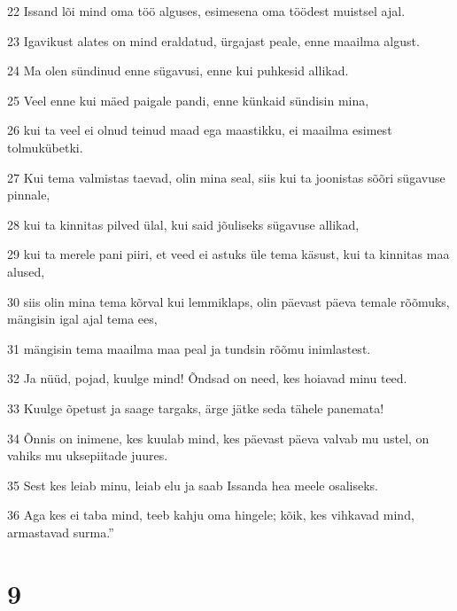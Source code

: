 \par 22 Issand lõi mind oma töö alguses, esimesena oma töödest muistsel ajal.
\par 23 Igavikust alates on mind eraldatud, ürgajast peale, enne maailma algust.
\par 24 Ma olen sündinud enne sügavusi, enne kui puhkesid allikad.
\par 25 Veel enne kui mäed paigale pandi, enne künkaid sündisin mina,
\par 26 kui ta veel ei olnud teinud maad ega maastikku, ei maailma esimest tolmukübetki.
\par 27 Kui tema valmistas taevad, olin mina seal, siis kui ta joonistas sõõri sügavuse pinnale,
\par 28 kui ta kinnitas pilved ülal, kui said jõuliseks sügavuse allikad,
\par 29 kui ta merele pani piiri, et veed ei astuks üle tema käsust, kui ta kinnitas maa alused,
\par 30 siis olin mina tema kõrval kui lemmiklaps, olin päevast päeva temale rõõmuks, mängisin igal ajal tema ees,
\par 31 mängisin tema maailma maa peal ja tundsin rõõmu inimlastest.
\par 32 Ja nüüd, pojad, kuulge mind! Õndsad on need, kes hoiavad minu teed.
\par 33 Kuulge õpetust ja saage targaks, ärge jätke seda tähele panemata!
\par 34 Õnnis on inimene, kes kuulab mind, kes päevast päeva valvab mu ustel, on vahiks mu uksepiitade juures.
\par 35 Sest kes leiab minu, leiab elu ja saab Issanda hea meele osaliseks.
\par 36 Aga kes ei taba mind, teeb kahju oma hingele; kõik, kes vihkavad mind, armastavad surma.”

\chapter{9}

